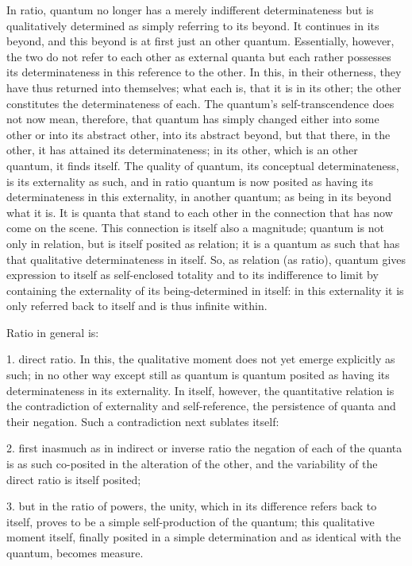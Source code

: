 In ratio, quantum no longer has
a merely indifferent determinateness
but is qualitatively determined as
simply referring to its beyond.
It continues in its beyond, and this beyond is
at first just an other quantum.
Essentially, however, the two do not refer
to each other as external quanta
but each rather possesses its determinateness
in this reference to the other.
In this, in their otherness, they have
thus returned into themselves;
what each is, that it is in its other;
the other constitutes the determinateness of each.
The quantum's self-transcendence does not now mean, therefore,
that quantum has simply changed either into some other
or into its abstract other, into its abstract beyond,
but that there, in the other, it has attained its determinateness;
in its other, which is an other quantum, it finds itself.
The quality of quantum, its conceptual determinateness,
is its externality as such,
and in ratio quantum is now posited as having
its determinateness in this externality, in another quantum;
as being in its beyond what it is.
It is quanta that stand to each other in the connection
that has now come on the scene.
This connection is itself also a magnitude;
quantum is not only in relation,
but is itself posited as relation;
it is a quantum as such that has
that qualitative determinateness in itself.
So, as relation (as ratio),
quantum gives expression to itself as self-enclosed totality
and to its indifference to limit by containing
the externality of its being-determined in itself:
in this externality it is only referred back to itself
and is thus infinite within.

Ratio in general is:

1. direct ratio.
In this, the qualitative moment does not
yet emerge explicitly as such;
in no other way except still as quantum is quantum posited
as having its determinateness in its externality.
In itself, however, the quantitative relation is
the contradiction of externality and self-reference,
the persistence of quanta and their negation.
Such a contradiction next sublates itself:

2. first inasmuch as in indirect or inverse ratio
the negation of each of the quanta is
as such co-posited in the alteration of the other,
and the variability of the direct ratio is itself posited;

3. but in the ratio of powers, the unity,
which in its difference refers back to itself,
proves to be a simple self-production of the quantum;
this qualitative moment itself,
finally posited in a simple determination
and as identical with the quantum, becomes measure.

